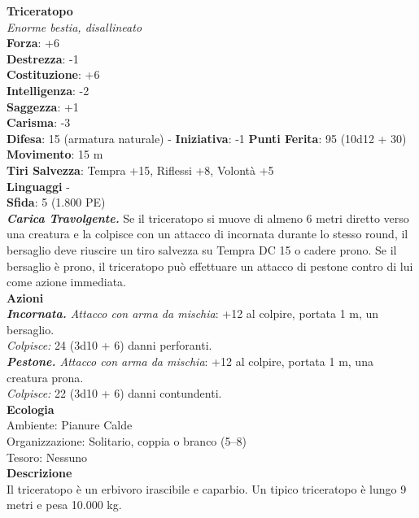 \begin{multicols}{2}
\medskip\textbf{Triceratopo}\\
\emph{Enorme bestia, disallineato}\\
\textbf{Forza}: +6\\
\textbf{Destrezza}: -1\\
\textbf{Costituzione}: +6\\
\textbf{Intelligenza}: -2\\
\textbf{Saggezza}: +1\\
\textbf{Carisma}: -3\\
\textbf{Difesa}: 15 (armatura naturale) - \textbf{Iniziativa}: -1
\textbf{Punti Ferita}: 95 (10d12 + 30)\\
\textbf{Movimento}: 15 m\\
\textbf{Tiri Salvezza}: Tempra +15, Riflessi +8, Volontà +5\\
\textbf{Linguaggi} -\\
\textbf{Sfida}: 5 (1.800 PE)\smallskip\\
\emph{\textbf{Carica Travolgente.}} Se il triceratopo si muove di almeno 6 metri diretto verso una creatura e la colpisce con un attacco di incornata durante lo stesso round, il bersaglio deve riuscire un tiro salvezza su Tempra DC  15 o cadere prono. Se il bersaglio è prono, il triceratopo può effettuare un attacco di pestone contro di lui come azione immediata.\\
\smallskip\textbf{Azioni}\\
\emph{\textbf{Incornata.} Attacco con arma da mischia}: +12 al colpire, portata 1 m, un bersaglio.\\
\emph{Colpisce:} 24 (3d10 + 6) danni perforanti.\\
\emph{\textbf{Pestone.} Attacco con arma da mischia}: +12 al colpire, portata 1 m, una creatura prona.\\
\emph{Colpisce:} 22 (3d10 + 6) danni contundenti.\\
\textbf{Ecologia}\\
Ambiente: Pianure Calde\\
Organizzazione: Solitario, coppia o branco (5–8)\\
Tesoro: Nessuno\\
\textbf{Descrizione}\\
Il triceratopo è un erbivoro irascibile e caparbio. Un tipico triceratopo è lungo 9 metri e pesa 10.000 kg.\\


\end{multicols}
